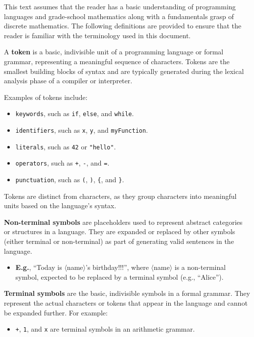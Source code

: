 This text assumes that the reader has a basic understanding of programming languages and grade-school mathematics along
with a fundamentals grasp of discrete mathematics. The following definitions are provided to ensure that the reader is familiar with
the terminology used in this document.
\begin{Def}[Token]

    A \textbf{token} is a basic, indivisible unit of a programming language or formal grammar, representing 
    a meaningful sequence of characters. Tokens are the smallest building blocks of syntax and are typically 
    generated during the lexical analysis phase of a compiler or interpreter.

    \vspace{1em}
    \noindent
    Examples of tokens include:
    \begin{itemize}
        \item \texttt{keywords}, such as \texttt{if}, \texttt{else}, and \texttt{while}.
        \item \texttt{identifiers}, such as \texttt{x}, \texttt{y}, and \texttt{myFunction}.
        \item \texttt{literals}, such as \texttt{42} or \texttt{"hello"}.
        \item \texttt{operators}, such as \texttt{+}, \texttt{-}, and \texttt{=}.
        \item \texttt{punctuation}, such as \texttt{(}, \texttt{)}, \texttt{\{}, and \texttt{\}}.
    \end{itemize}

    \vspace{1em}
    Tokens are distinct from characters, as they group characters into meaningful units based on the language's syntax.
\end{Def}

\begin{Def}
    
    \label{def:non-terminal-terminal}
    \textbf{Non-terminal symbols} are placeholders used to represent abstract categories or structures in a language. 
    They are expanded or replaced by other symbols (either terminal or non-terminal) as part of generating valid sentences 
    in the language.
    \begin{itemize}
    \item \textbf{E.g.}, ``Today is $\langle$name$\rangle$'s birthday!!!'', where $\langle$name$\rangle$ is a non-terminal symbol, 
    expected to be replaced by a terminal symbol (e.g., ``Alice''). 
    \end{itemize}

    \noindent
    \textbf{Terminal symbols} are the basic, indivisible symbols in a formal grammar. They represent the actual characters 
    or tokens that appear in the language and cannot be expanded further. For example:
    \begin{itemize}
        \item \texttt{+}, \texttt{1}, and \texttt{x} are terminal symbols in an arithmetic grammar.
    \end{itemize}
\end{Def}

